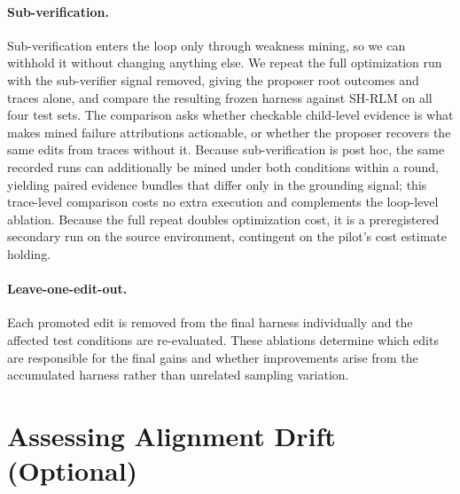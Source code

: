 \documentclass{article}
\begin{document}
\paragraph{Sub-verification.} Sub-verification enters the loop only through
weakness mining, so we can withhold it without changing anything else. We repeat
the full optimization run with the sub-verifier signal removed, giving the
proposer root outcomes and traces alone, and compare the resulting frozen harness
against SH-RLM on all four test sets. The comparison asks whether checkable
child-level evidence is what makes mined failure attributions actionable, or
whether the proposer recovers the same edits from traces without it. Because
sub-verification is post hoc, the same recorded runs can additionally be mined
under both conditions within a round, yielding paired evidence bundles that
differ only in the grounding signal; this trace-level comparison costs no extra
execution and complements the loop-level ablation. Because the full repeat
doubles optimization cost, it is a preregistered secondary run on the source
environment, contingent on the pilot's cost estimate holding.

\paragraph{Leave-one-edit-out.} Each promoted edit is removed from the final
harness individually and the affected test conditions are re-evaluated. These
ablations determine which edits are responsible for the final gains and whether
improvements arise from the accumulated harness rather than unrelated sampling
variation.

\section{Assessing Alignment Drift (Optional)}
\label{app:alignment}
  
\end{document}
